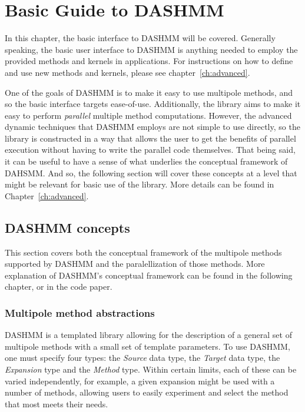 \chapter{Basic Guide to DASHMM}
\label{ch:basic}

In this chapter, the basic interface to DASHMM will be
covered. Generally speaking, the basic user interface to DASHMM is
anything needed to employ the provided methods and kernels in
applications. For instructions on how to define and use new methods and
kernels, please see chapter~\ref{ch:advanced}.

One of the goals of DASHMM is to make it easy to use multipole
methods, and so the basic interface targets ease-of-use. Additionally,
the library aims to make it easy to perform \emph{parallel} multiple
method computations. However, the advanced dynamic techniques
that DASHMM employs are not simple to use directly, so the library is
constructed in a way that allows the user to get the benefits of
parallel execution without having to write the parallel code
themselves. That being said, it can be useful to have a sense of what
underlies the conceptual framework of DAHSMM. And so, the following
section will cover these concepts at a level that might be relevant
for basic use of the library. More details can be found in
Chapter~\ref{ch:advanced}.

\section{DASHMM concepts}
This section covers both the conceptual framework of the multipole
methods supported by DASHMM and the paralellization of those
methods. More explanation of DASHMM's conceptual framework can be
found in the following chapter, or in the code paper.

\subsection{Multipole method abstractions}

DASHMM is a templated library allowing for the description of a
general set of multipole methods with a small set of template
parameters. To use DASHMM, one must specify four types: the {\it Source}
data type, the {\it Target} data type, the {\it Expansion} type and
the {\it Method} type. Within certain limits, each of these can be
varied independently, for example, a given expansion might be used
with a number of methods, allowing users to easily experiment and
select the method that most meets their needs.

